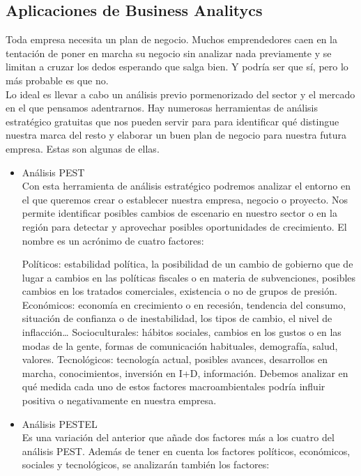 \documentclass[%
 reprint,
 amsmath,amssymb,
 aps,
]{revtex4-1}
\begin{document}
\subsection{Aplicaciones de  Business Analitycs }
Toda empresa necesita un plan de negocio. Muchos emprendedores caen en la tentación de poner en marcha su negocio sin analizar nada previamente y se limitan a cruzar los dedos esperando que salga bien. Y podría ser que sí, pero lo más probable es que no.\\
Lo ideal es llevar a cabo un análisis previo pormenorizado del sector y el mercado en el que pensamos adentrarnos. Hay numerosas herramientas de análisis estratégico gratuitas que nos pueden servir para para identificar qué distingue nuestra marca del resto y elaborar un buen plan de negocio para nuestra futura empresa. Estas son algunas de ellas.  
\begin{itemize}
\item Análisis PEST
\\Con esta herramienta de análisis estratégico podremos analizar el entorno en el que queremos crear o establecer nuestra empresa, negocio o proyecto. Nos permite identificar posibles cambios de escenario en nuestro sector o en la región para detectar y aprovechar posibles oportunidades de crecimiento. El nombre es un acrónimo de cuatro factores:

Políticos: estabilidad política, la posibilidad de un cambio de gobierno que de lugar a cambios en las políticas fiscales o en materia de subvenciones, posibles cambios en los tratados comerciales, existencia o no de grupos de presión.
Económicos: economía en crecimiento o en recesión, tendencia del consumo, situación de confianza o de inestabilidad, los tipos de cambio, el nivel de inflacción…
Socioculturales: hábitos sociales, cambios en los gustos o en las modas de la gente, formas de comunicación habituales, demografía, salud, valores.
Tecnológicos: tecnología actual, posibles avances, desarrollos en marcha, conocimientos, inversión en I+D, información.
Debemos analizar en qué medida cada uno de estos factores macroambientales podría influir positiva o negativamente en nuestra empresa.  
\item Análisis PESTEL
\\Es una variación del anterior que añade dos factores más a los cuatro del análisis PEST. Además de tener en cuenta los factores políticos, económicos, sociales y tecnológicos, se analizarán también los factores:


\end{itemize}
\end{document}

